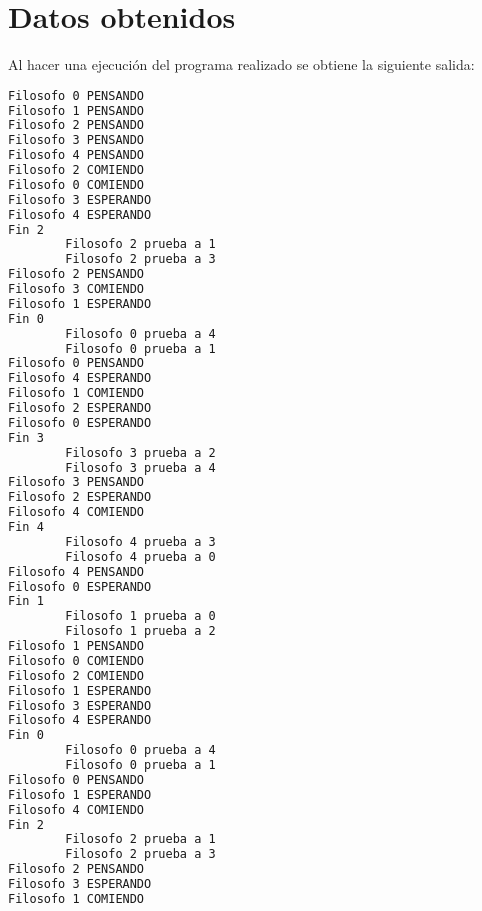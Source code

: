 \section{Datos obtenidos}

Al hacer una ejecución del programa realizado se obtiene la siguiente salida:
\begin{lstlisting}[language=bash, style=CodeStyle, caption={Ejemplo de salida programa de los filosofos comensales}, label={lst:Salida}]
Filosofo 0 PENSANDO
Filosofo 1 PENSANDO
Filosofo 2 PENSANDO
Filosofo 3 PENSANDO
Filosofo 4 PENSANDO
Filosofo 2 COMIENDO
Filosofo 0 COMIENDO
Filosofo 3 ESPERANDO
Filosofo 4 ESPERANDO
Fin 2
        Filosofo 2 prueba a 1
        Filosofo 2 prueba a 3
Filosofo 2 PENSANDO
Filosofo 3 COMIENDO
Filosofo 1 ESPERANDO
Fin 0
        Filosofo 0 prueba a 4
        Filosofo 0 prueba a 1
Filosofo 0 PENSANDO
Filosofo 4 ESPERANDO
Filosofo 1 COMIENDO
Filosofo 2 ESPERANDO
Filosofo 0 ESPERANDO
Fin 3
        Filosofo 3 prueba a 2
        Filosofo 3 prueba a 4
Filosofo 3 PENSANDO
Filosofo 2 ESPERANDO
Filosofo 4 COMIENDO
Fin 4
        Filosofo 4 prueba a 3
        Filosofo 4 prueba a 0
Filosofo 4 PENSANDO
Filosofo 0 ESPERANDO
Fin 1
        Filosofo 1 prueba a 0
        Filosofo 1 prueba a 2
Filosofo 1 PENSANDO
Filosofo 0 COMIENDO
Filosofo 2 COMIENDO
Filosofo 1 ESPERANDO
Filosofo 3 ESPERANDO
Filosofo 4 ESPERANDO
Fin 0
        Filosofo 0 prueba a 4
        Filosofo 0 prueba a 1
Filosofo 0 PENSANDO
Filosofo 1 ESPERANDO
Filosofo 4 COMIENDO
Fin 2
        Filosofo 2 prueba a 1
        Filosofo 2 prueba a 3
Filosofo 2 PENSANDO
Filosofo 3 ESPERANDO
Filosofo 1 COMIENDO
\end{lstlisting}

